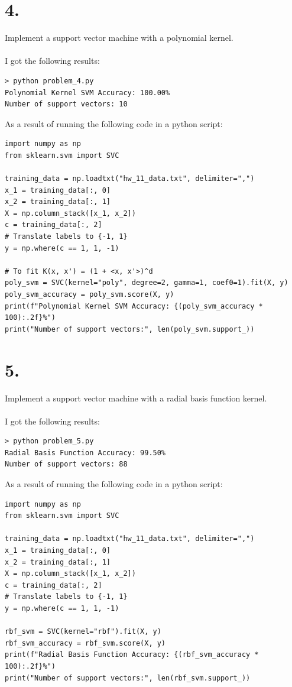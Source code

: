 \documentclass{article}
\begin{document}
{\Large 

\section*{4.}

Implement a support vector machine with a polynomial kernel. \\ \\
I got the following results:
\begin{verbatim}
> python problem_4.py
Polynomial Kernel SVM Accuracy: 100.00%
Number of support vectors: 10
\end{verbatim}
As a result of running the following code in a python script:
\begin{verbatim}
import numpy as np
from sklearn.svm import SVC

training_data = np.loadtxt("hw_11_data.txt", delimiter=",")
x_1 = training_data[:, 0]
x_2 = training_data[:, 1]
X = np.column_stack([x_1, x_2])
c = training_data[:, 2]
# Translate labels to {-1, 1}
y = np.where(c == 1, 1, -1)

# To fit K(x, x') = (1 + <x, x'>)^d
poly_svm = SVC(kernel="poly", degree=2, gamma=1, coef0=1).fit(X, y)
poly_svm_accuracy = poly_svm.score(X, y)
print(f"Polynomial Kernel SVM Accuracy: {(poly_svm_accuracy * 100):.2f}%")
print("Number of support vectors:", len(poly_svm.support_))
\end{verbatim}

}
{\Large 

\section*{5.}

Implement a support vector machine with a radial basis function kernel. \\ \\
I got the following results:
\begin{verbatim}
> python problem_5.py
Radial Basis Function Accuracy: 99.50%
Number of support vectors: 88
\end{verbatim}
As a result of running the following code in a python script:
\begin{verbatim}
import numpy as np
from sklearn.svm import SVC

training_data = np.loadtxt("hw_11_data.txt", delimiter=",")
x_1 = training_data[:, 0]
x_2 = training_data[:, 1]
X = np.column_stack([x_1, x_2])
c = training_data[:, 2]
# Translate labels to {-1, 1}
y = np.where(c == 1, 1, -1)

rbf_svm = SVC(kernel="rbf").fit(X, y)
rbf_svm_accuracy = rbf_svm.score(X, y)
print(f"Radial Basis Function Accuracy: {(rbf_svm_accuracy * 100):.2f}%")
print("Number of support vectors:", len(rbf_svm.support_))
\end{verbatim}

}
\end{document}
